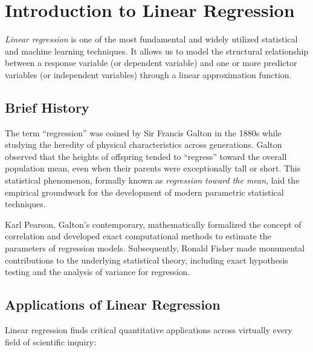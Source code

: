 \section{Introduction to Linear Regression}

\emph{Linear regression} is one of the most fundamental and widely utilized statistical and machine learning techniques. It allows us to model the structural relationship between a response variable (or dependent variable) and one or more predictor variables (or independent variables) through a linear approximation function.

\subsection{Brief History}

The term ``regression'' was coined by Sir Francis Galton in the 1880s while studying the heredity of physical characteristics across generations. Galton observed that the heights of offspring tended to ``regress'' toward the overall population mean, even when their parents were exceptionally tall or short. This statistical phenomenon, formally known as \emph{regression toward the mean}, laid the empirical groundwork for the development of modern parametric statistical techniques.

Karl Pearson, Galton's contemporary, mathematically formalized the concept of correlation and developed exact computational methods to estimate the parameters of regression models. Subsequently, Ronald Fisher made monumental contributions to the underlying statistical theory, including exact hypothesis testing and the analysis of variance for regression.

\subsection{Applications of Linear Regression}

Linear regression finds critical quantitative applications across virtually every field of scientific inquiry:

